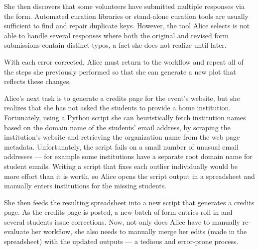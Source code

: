 She then discovers that some volunteers have submitted multiple responses via the form.
Automated curation libraries or stand-alone curation tools \cite{ilyas-15-tcrd,DBLP:conf/chi/KandelPHH11} are usually sufficient to find and repair duplicate keys.
However, the tool Alice selects %
is not able to handle several responses where both the original and revised form submissions contain distinct typos, a fact she does not realize until later.


With each error corrected, Alice must return to the workflow and repeat all of the steps she previously performed so that she can generate a new plot that reflects these changes.


Alice's next task is to generate a credits page for the event's website, but she realizes that she has not asked the students to provide a home institution. Fortunately, using a Python script she can heuristically fetch institution names based on the domain name of the students' email address, by scraping the institution's website and retrieving the organization name from the web page metadata.
Unfortunately, the script fails on a small number of unusual email addresses --- for example some institutions have a separate root domain name for student emails.
Writing a script that fixes each outlier individually would be more effort than it is worth, so Alice opens the script output in a spreadsheet and manually enters institutions for the missing students.


She then feeds the resulting spreadsheet into a new script that generates a credits page.
As the credits page is posted, a new batch of form entries roll in and several students issue corrections.
Now, not only does Alice have to manually re-evaluate her workflow, she also needs to manually merge her edits (made in the spreadsheet) with the updated outputs --- a tedious and error-prone process.


